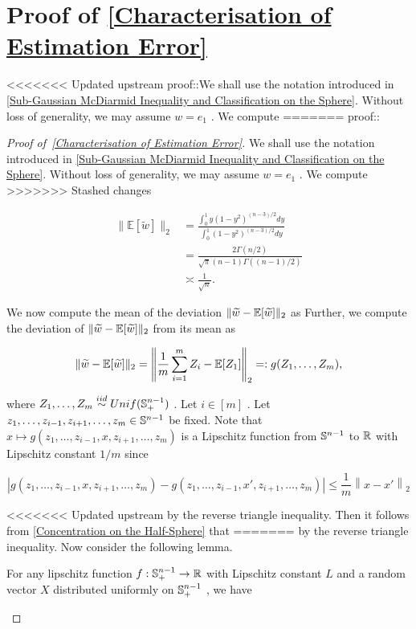 \documentclass{article}
\begin{document}
\section{Proof of \autoref{Characterisation of Estimation Error}}
\label{section:Proof of \autoref{Characterisation of Estimation Error}}
<<<<<<< Updated upstream
proof::We shall use the notation introduced in \autoref{Sub-Gaussian McDiarmid Inequality and Classification on the Sphere}. Without loss of generality, we may assume  $w = e_1$ . We compute
=======
proof::
\begin{proof}[Proof of~{\autoref{Characterisation of Estimation Error}}]
\label{proof:Characterisation of Estimation Error}
We shall use the notation introduced in \autoref{Sub-Gaussian McDiarmid Inequality and Classification on the Sphere}. Without loss of generality, we may assume  $w = e_1$ . We compute
>>>>>>> Stashed changes


\begin{align*}
\|\mathbb{E} [\widetilde{w}]\|_2 &= \frac{\int_0^1 y (1-y^2)^{(n-3)/2}dy}{\int_0^1 (1-y^2)^{(n-3)/2} dy}\\
&= \frac{2 \Gamma(n/2)}{\sqrt{\pi} (n-1) \Gamma((n-1)/2)}\\
&\asymp \frac{1}{\sqrt{n}}. 
\end{align*}

We now compute the mean of the deviation  $\|\widetilde{w} -\mathbb{E}[\widetilde{w}]\|_2$  as Further, we compute the deviation of  $\|\widetilde{w} -\mathbb{E}[\widetilde{w}]\|_2$  from its mean as


\begin{equation*}
\| \widetilde{w} - \mathbb{E}[\widetilde{w}]\|_2 = \left\|\frac{1}{m}\sum_{i=1}^m Z_i - \mathbb{E}[Z_1]\right\|_2 =: g(Z_1, \dots, Z_m),
\end{equation*}

where  $Z_1, \dots, Z_m \stackrel{iid}{\sim} Unif(\mathbb{S}^{n-1}_+)$ . Let  $i \in [m]$ . Let  $z_1, \dots, z_{i-1}, z_{i+1}, \dots, z_m \in \mathbb{S}^{n-1}$  be fixed. Note that  $x \mapsto g(z_1, \dots, z_{i-1}, x, z_{i+1}, \dots, z_m)$   is a Lipschitz function from  $\mathbb{S}^{n-1}$  to  $\mathbb{R}$  with Lipschitz constant  $1/m$  since


\begin{equation*}
|g(z_1, \dots, z_{i-1}, x, z_{i+1}, \dots, z_m) - g(z_1, \dots, z_{i-1}, x', z_{i+1}, \dots, z_m)| \le \frac{1}{m}\left\|x-x'\right\|_2
\end{equation*}

<<<<<<< Updated upstream
by the reverse triangle inequality. Then it follows from \autoref{Concentration on the Half-Sphere} that
=======
by the reverse triangle inequality. Now consider the following lemma. 
\begin{lemma}
\label{Concentration on the Half-Sphere}
For any lipschitz function  $f:\mathbb{S}^{n-1}_+ \to \mathbb{R}$  with Lipschitz constant  $L$  and a random vector  $X$  distributed uniformly on  $\mathbb{S}^{n-1}_+$ , we have



\end{lemma}
\end{proof}
\end{document}
